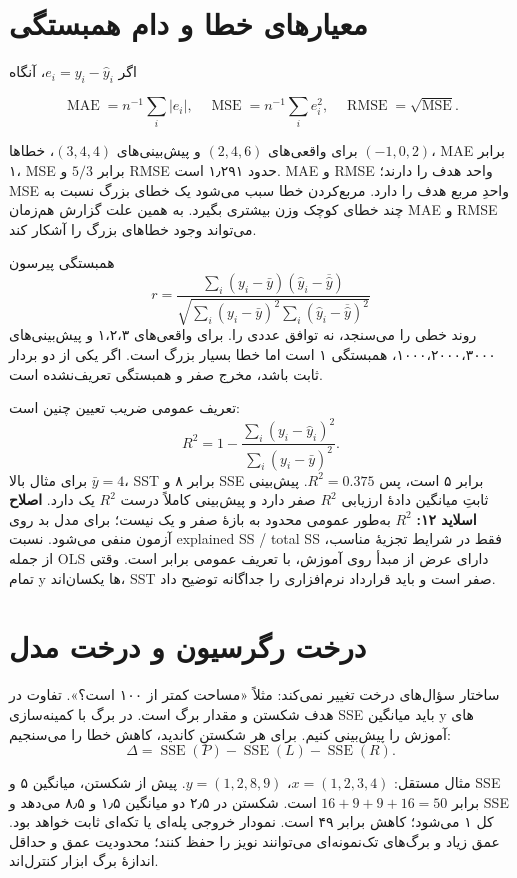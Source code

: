 \section{معیارهای خطا و دام همبستگی}

اگر \(e_i=y_i-\widehat y_i\)، آنگاه

\[
\operatorname{MAE}=n^{-1}\sum_i|e_i|,\quad
\operatorname{MSE}=n^{-1}\sum_i e_i^2,\quad
\operatorname{RMSE}=\sqrt{\operatorname{MSE}}.
\]

برای واقعی‌های \((2,4,6)\) و پیش‌بینی‌های \((3,4,4)\)، خطاها \((-1,0,2)\)، MAE برابر ۱، MSE برابر \(5/3\) و RMSE حدود ۱٫۲۹۱ است. MAE و RMSE واحد هدف را دارند؛ MSE واحدِ مربع هدف را دارد. مربع‌کردن خطا سبب می‌شود یک خطای بزرگ نسبت به چند خطای کوچک وزن بیشتری بگیرد. به همین علت گزارش هم‌زمان MAE و RMSE می‌تواند وجود خطاهای بزرگ را آشکار کند.

همبستگی پیرسون \[
r=\frac{\sum_i(y_i-\bar y)(\widehat y_i-\overline{\widehat y})}{\sqrt{\sum_i(y_i-\bar y)^2\sum_i(\widehat y_i-\overline{\widehat y})^2}}
\] روند خطی را می‌سنجد، نه توافق عددی را. برای واقعی‌های ۱،۲،۳ و پیش‌بینی‌های ۱۰۰۰،۲۰۰۰،۳۰۰۰، همبستگی ۱ است اما خطا بسیار بزرگ است. اگر یکی از دو بردار ثابت باشد، مخرج صفر و همبستگی تعریف‌نشده است.

تعریف عمومی ضریب تعیین چنین است: \[
R^2=1-\frac{\sum_i(y_i-\widehat y_i)^2}{\sum_i(y_i-\bar y)^2}.
\] برای مثال بالا \(\bar y=4\)، SST برابر ۸ و SSE برابر ۵ است، پس \(R^2=0.375\). پیش‌بینی ثابتِ میانگین دادهٔ ارزیابی $R^2$ صفر دارد و پیش‌بینی کاملاً درست $R^2$ یک دارد. \textbf{اصلاح اسلاید ۱۲:} $R^2$ به‌طور عمومی محدود به بازهٔ صفر و یک نیست؛ برای مدل بد روی آزمون منفی می‌شود. نسبت explained SS / total SS فقط در شرایط تجزیهٔ مناسب، از جمله OLS دارای عرض از مبدأ روی آموزش، با تعریف عمومی برابر است. وقتی تمام y ها یکسان‌اند، SST صفر است و باید قرارداد نرم‌افزاری را جداگانه توضیح داد.

\section{درخت رگرسیون و درخت مدل}

ساختار سؤال‌های درخت تغییر نمی‌کند: مثلاً «مساحت کمتر از ۱۰۰ است؟». تفاوت در هدف شکستن و مقدار برگ است. در برگ با کمینه‌سازی SSE باید میانگین y های آموزش را پیش‌بینی کنیم. برای هر شکستنِ کاندید، کاهش خطا را می‌سنجیم: \[
\Delta=\operatorname{SSE}(P)-\operatorname{SSE}(L)-\operatorname{SSE}(R).
\]

مثال مستقل: \(x=(1,2,3,4)\)، \(y=(1,2,8,9)\). پیش از شکستن، میانگین ۵ و SSE برابر \(16+9+9+16=50\) است. شکستن در ۲٫۵ دو میانگین ۱٫۵ و ۸٫۵ می‌دهد و SSE کل ۱ می‌شود؛ کاهش برابر ۴۹ است. نمودار خروجی پله‌ای یا تکه‌ای ثابت خواهد بود. عمق زیاد و برگ‌های تک‌نمونه‌ای می‌توانند نویز را حفظ کنند؛ محدودیت عمق و حداقل اندازهٔ برگ ابزار کنترل‌اند.

